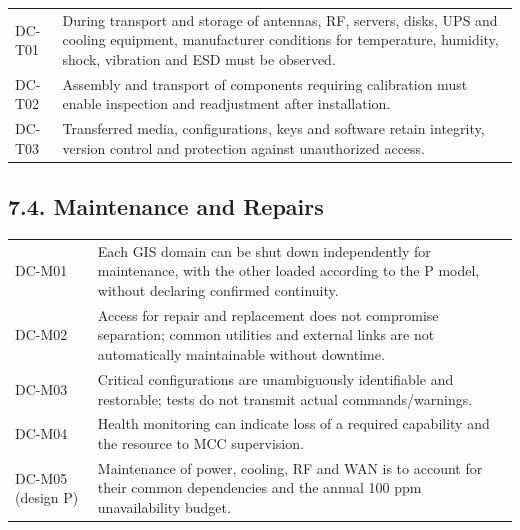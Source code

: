 \begingroup{}
\begin{longtable}{|P{0.16}|P{0.84}|}
\hline{}
 & \\ \hline
\endhead
\hline\endlastfoot
DC-T01 & During transport and storage of antennas, RF, servers, disks, UPS and cooling equipment, manufacturer conditions for temperature, humidity, shock, vibration and ESD must be observed.\\ \hline
DC-T02 & Assembly and transport of components requiring calibration must enable inspection and readjustment after installation.\\ \hline
DC-T03 & Transferred media, configurations, keys and software retain integrity, version control and protection against unauthorized access.\\*
\end{longtable}
\endgroup

\subsection{7.4. Maintenance and Repairs}\label{maintainability-constraints}

\begingroup{}
\begin{longtable}{|P{0.16}|P{0.84}|}
\hline{}
 & \\ \hline
\endhead
\hline\endlastfoot
DC-M01 & Each GIS domain can be shut down independently for maintenance, with the other loaded according to the P model, without declaring confirmed continuity.\\ \hline
DC-M02 & Access for repair and replacement does not compromise separation; common utilities and external links are not automatically maintainable without downtime.\\ \hline
DC-M03 & Critical configurations are unambiguously identifiable and restorable; tests do not transmit actual commands/\allowbreak{}warnings.\\ \hline
DC-M04 & Health monitoring can indicate loss of a required capability and the resource to MCC supervision.\\ \hline
DC-M05 (design P) & Maintenance of power, cooling, RF and WAN is to account for their common dependencies and the annual 100 ppm unavailability budget.\\*
\end{longtable}
\endgroup

